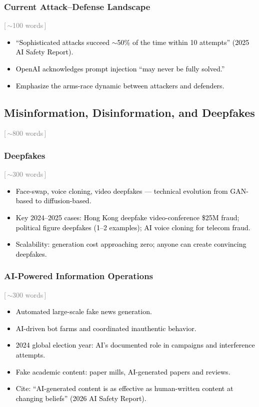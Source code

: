 \documentclass[preprint,12pt]{elsarticle}
\newcommand{\wordcount}[1]{\hfill\textcolor{gray}{\small[\,#1\,]}}
\newcommand{\outline}[1]{\textcolor{black}{#1}}
\begin{document}
\subsubsection{Current Attack--Defense Landscape} \wordcount{$\sim$100 words}

\outline{%
\begin{itemize}[nosep,leftmargin=1.5em]
    \item ``Sophisticated attacks succeed $\sim$50\% of the time within 10 attempts'' (2025 AI Safety Report).
    \item OpenAI acknowledges prompt injection ``may never be fully solved.''
    \item Emphasize the arms-race dynamic between attackers and defenders.
\end{itemize}
}


\subsection{Misinformation, Disinformation, and Deepfakes} \wordcount{$\sim$800 words}
\label{sec:threat-misinfo}

\subsubsection{Deepfakes} \wordcount{$\sim$300 words}

\outline{%
\begin{itemize}[nosep,leftmargin=1.5em]
    \item Face-swap, voice cloning, video deepfakes --- technical evolution from GAN-based to diffusion-based.
    \item Key 2024--2025 cases: Hong Kong deepfake video-conference \$25M fraud; political figure deepfakes (1--2 examples); AI voice cloning for telecom fraud.
    \item Scalability: generation cost approaching zero; anyone can create convincing deepfakes.
\end{itemize}
}

\subsubsection{AI-Powered Information Operations} \wordcount{$\sim$300 words}

\outline{%
\begin{itemize}[nosep,leftmargin=1.5em]
    \item Automated large-scale fake news generation.
    \item AI-driven bot farms and coordinated inauthentic behavior.
    \item 2024 global election year: AI's documented role in campaigns and interference attempts.
    \item Fake academic content: paper mills, AI-generated papers and reviews.
    \item Cite: ``AI-generated content is as effective as human-written content at changing beliefs'' (2026 AI Safety Report).
\end{itemize}
}
\end{document}
